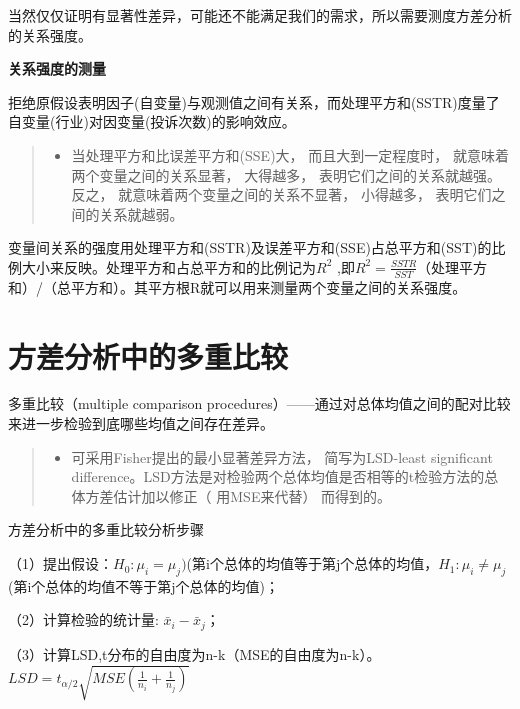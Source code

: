 \documentclass[]{ctexbook}
\providecommand{\tightlist}{%
  \setlength{\itemsep}{0pt}\setlength{\parskip}{0pt}}
\begin{document}
当然仅仅证明有显著性差异，可能还不能满足我们的需求，所以需要测度方差分析的关系强度。

\textbf{关系强度的测量}

拒绝原假设表明因子(自变量)与观测值之间有关系，而处理平方和(SSTR)度量了自变量(行业)对因变量(投诉次数)的影响效应。

\begin{quote}
\begin{itemize}
\tightlist
\item
  当处理平方和比误差平方和(SSE)大， 而且大到一定程度时， 就意味着两个变量之间的关系显著， 大得越多， 表明它们之间的关系就越强。 反之， 就意味着两个变量之间的关系不显著， 小得越多， 表明它们之间的关系就越弱。
\end{itemize}
\end{quote}

变量间关系的强度用处理平方和(SSTR)及误差平方和(SSE)占总平方和(SST)的比例大小来反映。处理平方和占总平方和的比例记为\(R^2\) ,即\(R^2=\frac{SSTR}{SST}\)（处理平方和）/（总平方和）。其平方根R就可以用来测量两个变量之间的关系强度。

\hypertarget{ux65b9ux5deeux5206ux6790ux4e2dux7684ux591aux91cdux6bd4ux8f83}{%
\section{方差分析中的多重比较}\label{ux65b9ux5deeux5206ux6790ux4e2dux7684ux591aux91cdux6bd4ux8f83}}

多重比较（multiple comparison procedures）------通过对总体均值之间的配对比较来进一步检验到底哪些均值之间存在差异。

\begin{quote}
\begin{itemize}
\tightlist
\item
  可采用Fisher提出的最小显著差异方法， 简写为LSD-least significant difference。LSD方法是对检验两个总体均值是否相等的t检验方法的总体方差估计加以修正（ 用MSE来代替） 而得到的。
\end{itemize}
\end{quote}

方差分析中的多重比较分析步骤

（1）提出假设：\(H_0: \mu_i=\mu_j )\)(第i个总体的均值等于第j个总体的均值，\(H_1:\mu_i\neq\mu_j\)(第i个总体的均值不等于第j个总体的均值)；

（2）计算检验的统计量: \(\bar x_i-\bar x_j\)；

（3）计算LSD,t分布的自由度为n-k（MSE的自由度为n-k）。\(LSD=t_{\alpha/2}\sqrt{MSE(\frac{1}{n_i}+\frac{1}{n_j})}\)
\end{document}
